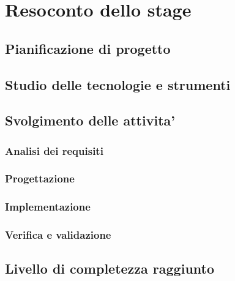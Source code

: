 \section{Resoconto dello stage}
\subsection{Pianificazione di progetto}

\subsection{Studio delle tecnologie e strumenti}

\subsection{Svolgimento delle attivita'}
\subsubsection{Analisi dei requisiti}
\subsubsection{Progettazione}
\subsubsection{Implementazione}
\subsubsection{Verifica e validazione}

\subsection{Livello di completezza raggiunto}